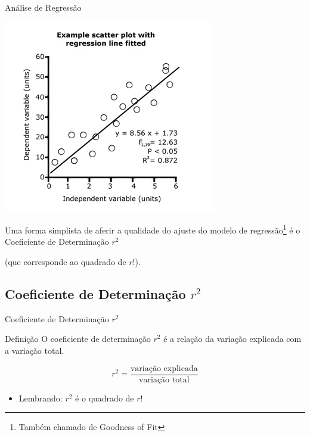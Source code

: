 \documentclass{beamer}
\begin{document}
\begin{frame}{Análise de Regressão}
  \begin{center}
      \includegraphics[height=0.6\textheight]{Cap18-19/residuos2}
  \end{center}

  \small
  Uma forma \alert{simplista} de aferir a qualidade do ajuste do modelo de regressão\footnote{Também chamado de Goodness of Fit} é o Coeficiente de Determinação $r^2$

  {\scriptsize (que corresponde ao quadrado de $r$!)}.
\end{frame}


\subsection[$R^2$]{Coeficiente de Determinação $r^2$}

\begin{frame}{Coeficiente de Determinação $r^2$}
  \begin{block}{Definição}
    O \alert{coeficiente de determinação} $r^2$ é a relação da
    variação explicada com a variação total.
  \end{block}
  \begin{displaymath}
    r^2 = \frac{\text{variação explicada}}{\text{variação total}}
  \end{displaymath}
  \begin{itemize}
  \item Lembrando: $r^2$ é o quadrado de $r$!
  \end{itemize}
\end{frame}
\end{document}

